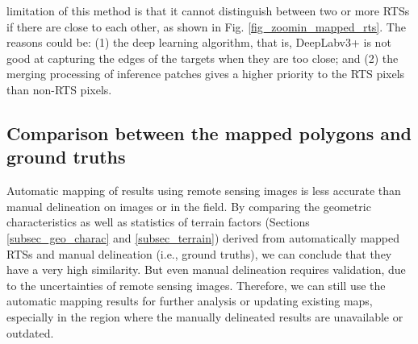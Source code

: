 \documentclass[authoryear,preprint,review,12pt]{elsarticle}
\begin{document}


 limitation of this method is that it cannot distinguish between two or more RTSs if there are close to each other, as shown in Fig. \ref{fig_zoomin_mapped_rts}. %
The reasons could be: (1) the deep learning algorithm, that is, DeepLabv3+ is not good at capturing the edges of the targets when they are too close; and (2) the merging processing of inference patches gives a higher priority to the RTS pixels than non-RTS pixels.

\subsection{Comparison between the mapped polygons and ground truths}
\label{subsec_potential_largeArea}



Automatic mapping of results using remote sensing images is less accurate than manual delineation on images or in the field. 
By comparing the geometric characteristics as well as statistics of terrain factors (Sections \ref{subsec_geo_charac} and \ref{subsec_terrain}) derived from automatically mapped RTSs and manual delineation (i.e., ground truths), we can conclude that they have a very high similarity. 
But even manual delineation requires validation, due to the uncertainties of remote sensing images.  
Therefore, we can still use the automatic mapping results for further analysis or updating existing maps, especially in the region where the manually delineated results are unavailable or outdated. 
\end{document}
